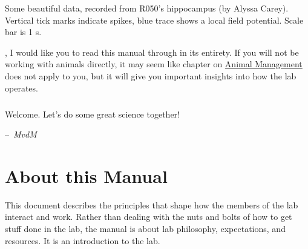 \documentclass{tufte-book}
\makeatletter
\newenvironment{chapquote}[2][2em]
  {\setlength{\@tempdima}{#1}%
   \def\chapquote@author{#2}%
   \parshape 1 \@tempdima \dimexpr\textwidth-2\@tempdima\relax%
   \itshape}
  {\par\normalfont\hfill--\ \chapquote@author\hspace*{\@tempdima}\par\bigskip}
\makeatother
\begin{document}
\begin{marginfigure}
\caption{Some beautiful data, recorded from R050's hippocampus (by
  Alyssa Carey). Vertical tick marks indicate spikes, blue trace shows
  a local field potential. Scale bar is 1 s.}
\label{fig:raster}
\end{marginfigure}

, I would like you to read this
manual through in its entirety. If you will not be working with
animals directly, it may seem like chapter on
\hyperref[sec:animal-management]{Animal Management} does not apply to
you, but it will give you important insights into how the lab
operates.

\paragraph{} Welcome. Let's do some great science together!

\begin{chapquote}{{\it MvdM}}
\end{chapquote}
\mainmatter

\chapter{About this Manual}

This document describes the principles that shape how the
members of the lab interact and work. Rather than dealing with the
nuts and bolts of how to get stuff done in the lab, the manual is
about lab philosophy, expectations, and resources. It is an
introduction to the lab.
\end{document}
